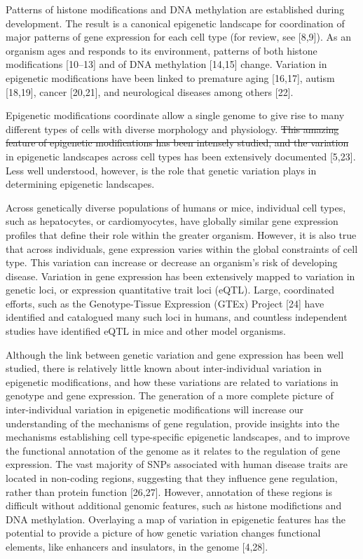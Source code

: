 \documentclass[10pt,letterpaper]{article}
\providecommand{\DIFaddtex}[1]{{\protect\color{blue}\uwave{#1}}} %
\providecommand{\DIFdeltex}[1]{{\protect\color{red}\sout{#1}}}                      %
\providecommand{\DIFaddbegin}{} %
\providecommand{\DIFaddend}{} %
\providecommand{\DIFdelbegin}{} %
\providecommand{\DIFdelend}{} %
\providecommand{\DIFadd}[1]{\texorpdfstring{\DIFaddtex{#1}}{#1}} %
\providecommand{\DIFdel}[1]{\texorpdfstring{\DIFdeltex{#1}}{}} %
\newcommand{\DIFscaledelfig}{0.5}
\newlength{\DIFdelgraphicswidth} %
\newlength{\DIFdelgraphicsheight} %
\newcommand{\DIFaddincludegraphics}[2][]{{\color{blue}\fbox{\DIFOincludegraphics[#1]{#2}}}} %
\newcommand{\DIFdelincludegraphics}[2][]{%
\sbox{\DIFdelgraphicsbox}{\DIFOincludegraphics[#1]{#2}}%
\settoboxwidth{\DIFdelgraphicswidth}{\DIFdelgraphicsbox} %
\settoboxtotalheight{\DIFdelgraphicsheight}{\DIFdelgraphicsbox} %
\scalebox{\DIFscaledelfig}{%
\parbox[b]{\DIFdelgraphicswidth}{\usebox{\DIFdelgraphicsbox}\\[-\baselineskip] \rule{\DIFdelgraphicswidth}{0em}}\llap{\resizebox{\DIFdelgraphicswidth}{\DIFdelgraphicsheight}{%
\setlength{\unitlength}{\DIFdelgraphicswidth}%
\begin{picture}(1,1)%
\thicklines\linethickness{2pt} %
{\color[rgb]{1,0,0}\put(0,0){\framebox(1,1){}}}%
{\color[rgb]{1,0,0}\put(0,0){\line( 1,1){1}}}%
{\color[rgb]{1,0,0}\put(0,1){\line(1,-1){1}}}%
\end{picture}%
}\hspace*{3pt}}} %
} %
\DeclareRobustCommand{\DIFaddbegin}{\DIFOaddbegin \let\includegraphics\DIFaddincludegraphics} %
\DeclareRobustCommand{\DIFaddend}{\DIFOaddend \let\includegraphics\DIFOincludegraphics} %
\DeclareRobustCommand{\DIFdelbegin}{\DIFOdelbegin \let\includegraphics\DIFdelincludegraphics} %
\DeclareRobustCommand{\DIFdelend}{\DIFOaddend \let\includegraphics\DIFOincludegraphics} %
\begin{document}
Patterns of histone modifications and DNA methylation are established
during development. The result is a canonical epigenetic landscape for
coordination of major patterns of gene expression for each cell type
(for review, see {[}8,9{]}). As an organism ages and responds to its
environment, patterns of both histone modifications {[}10--13{]} and of
DNA methylation {[}14,15{]} change. Variation in epigenetic
modifications have been linked to premature aging {[}16,17{]}, autism
{[}18,19{]}, cancer {[}20,21{]}, and neurological diseases among others
{[}22{]}.

Epigenetic modifications coordinate allow a single genome to give rise
to many different types of cells with diverse morphology and physiology.
\DIFdelbegin \DIFdel{This amazing feature of epigenetic modifications has been intensely
studied, and the variation }\DIFdelend \DIFaddbegin \DIFadd{Variation }\DIFaddend in epigenetic landscapes across cell types has been
extensively documented {[}5,23{]}. Less well understood, however, is the
role that genetic variation plays in determining epigenetic landscapes.

Across genetically diverse populations of humans or mice, individual
cell types, such as hepatocytes, or cardiomyocytes, have globally
similar gene expression profiles that define their role within the
greater organism. However, it is also true that across individuals, gene
expression varies within the global constraints of cell type. This
variation can increase or decrease an organism's risk of developing
disease. Variation in gene expression has been extensively mapped to
variation in genetic loci, or expression quantitative trait loci (eQTL).
Large, coordinated efforts, such as the Genotype-Tissue Expression
(GTEx) Project {[}24{]} have identified and catalogued many such loci in
humans, and countless independent studies have identified eQTL in mice
and other model organisms.

Although the link between genetic variation and gene expression has been
well studied, there is relatively little known about inter-individual
variation in epigenetic modifications, and how these variations are
related to variations in genotype and gene expression. The generation of
a more complete picture of inter-individual variation in epigenetic
modifications will increase our understanding of the mechanisms of gene
regulation, provide insights into the mechanisms establishing cell
type-specific epigenetic landscapes, and to improve the functional
annotation of the genome as it relates to the regulation of gene
expression. The vast majority of SNPs associated with human disease
traits are located in non-coding regions, suggesting that they influence
gene regulation, rather than protein function {[}26,27{]}. However,
annotation of these regions is difficult without additional genomic
features, such as histone modifictions and DNA methylation. Overlaying a
map of variation in epigenetic features has the potential to provide a
picture of how genetic variation changes functional elements, like
enhancers and insulators, in the genome {[}4,28{]}.
\end{document}
